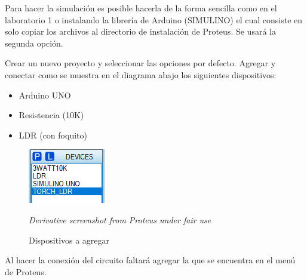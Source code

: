 \documentclass{article}
\begin{document}
Para hacer la simulación es posible hacerla de la forma sencilla como en el
laboratorio 1 o instalando la librería de Arduino (SIMULINO) el cual consiste
en solo copiar los archivos al directorio de instalación de Proteus. Se usará
la segunda opción.

\bigbreak

Crear un nuevo proyecto y seleccionar las opciones por defecto. Agregar y
conectar como se muestra en el diagrama abajo los siguientes dispositivos:

\begin{itemize}
\item Arduino UNO
\item Resistencia (10K)
\item LDR (con foquito)
\end{itemize}

\begin{figure}[H]
\centering
\includegraphics[width=0.1\paperwidth]{images/proteus-devices}
\caption{Dispositivos a agregar}\footnotesize
\textit{Derivative screenshot from Proteus under fair use}
\end{figure}

Al hacer la conexión del circuito faltará agregar la 
que se encuentra en el menú  de Proteus.
\end{document}
